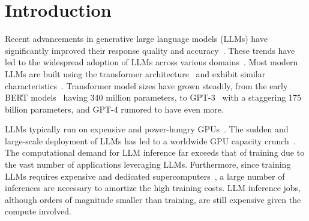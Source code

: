 \section{Introduction}
\label{sec:intro}

Recent advancements in generative large language models (LLMs) have significantly improved their response quality and accuracy~\cite{chatgptapi, hf_llama2}.
These trends have led to the widespread adoption of LLMs across various domains~\cite{bardassistant,newbing}.
Most modern LLMs are built using the transformer architecture~\cite{wolf2020transformers, vaswani2017attention} and exhibit similar characteristics~\cite{patel2024llmpower}.
Transformer model sizes have grown steadily, from the early BERT models~\cite{devlin2018bert} having 340 million parameters, to GPT-3~\cite{gpt3oai} with a staggering 175 billion parameters, and GPT-4 rumored to have even more.

LLMs typically run on expensive and power-hungry GPUs~\cite{dgxh100}.
The sudden and large-scale deployment of LLMs has led to a worldwide GPU capacity crunch~\cite{capacitycrunch}.
The computational demand for LLM inference far exceeds that of training due to the vast number of applications leveraging LLMs.
Furthermore, since training LLMs requires expensive and dedicated supercomputers~\cite{openai_7500k8s,meta_ai_supercluster}, a large number of inferences are necessary to amortize %
the high training costs.
LLM inference jobs, although orders of magnitude smaller than training, are still expensive given the compute involved.


